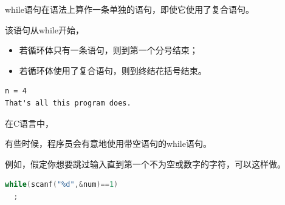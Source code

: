 \begin{frame}[fragile]
while语句在语法上算作一条单独的语句，即使它使用了复合语句。 \vspace{.1in}

该语句从while开始，\vspace{.1in}
\begin{itemize}
  \item 若循环体只有一条语句，则到第一个分号结束；\\[.1in]
  \item 若循环体使用了复合语句，则到终结花括号结束。
\end{itemize}
\end{frame}

\begin{frame}[fragile]

\pause 
\begin{lstlisting}
n = 4
That's all this program does.
\end{lstlisting}
\end{frame}

\begin{frame}[fragile]
  在C语言中，
\end{frame}

\begin{frame}[fragile]
有些时候，程序员会有意地使用带空语句的while语句。
\vspace{.1in}

例如，假定你想要跳过输入直到第一个不为空或数字的字符，可以这样做。
\pause \vspace{.1in}

\begin{lstlisting}[language=c]
while(scanf("%d",&num)==1)
  ;
\end{lstlisting}\pause\vspace{.1in}

\end{frame}

